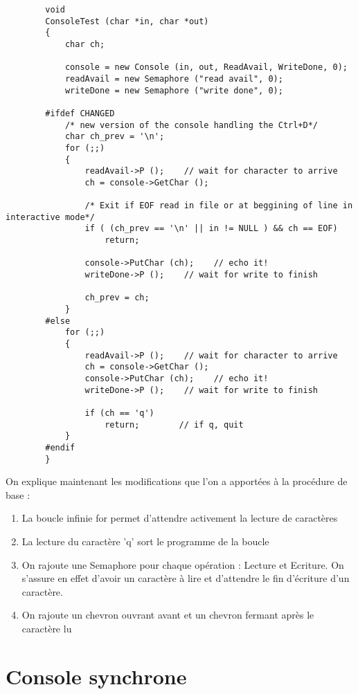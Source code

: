 \documentclass[a4paper,10pt]{article}
\begin{document}
    \begin{lstlisting}
        void
        ConsoleTest (char *in, char *out)
        {
            char ch;

            console = new Console (in, out, ReadAvail, WriteDone, 0);
            readAvail = new Semaphore ("read avail", 0);
            writeDone = new Semaphore ("write done", 0);

        #ifdef CHANGED
            /* new version of the console handling the Ctrl+D*/
            char ch_prev = '\n';
            for (;;)
            {
                readAvail->P ();    // wait for character to arrive
                ch = console->GetChar ();

                /* Exit if EOF read in file or at beggining of line in interactive mode*/
                if ( (ch_prev == '\n' || in != NULL ) && ch == EOF)
                    return;

                console->PutChar (ch);    // echo it!
                writeDone->P ();    // wait for write to finish

                ch_prev = ch;
            }
        #else
            for (;;)
            {
                readAvail->P ();    // wait for character to arrive
                ch = console->GetChar ();
                console->PutChar (ch);    // echo it!
                writeDone->P ();    // wait for write to finish

                if (ch == 'q')
                    return;        // if q, quit
            }
        #endif
        }
    \end{lstlisting}

    On explique maintenant les modifications que l'on a apportées à la procédure de base :
    \begin{enumerate}
        \item La boucle infinie for permet d'attendre activement la lecture de caractères
        \item La lecture du caractère 'q' sort le programme de la boucle
        \item On rajoute une Semaphore pour chaque opération : Lecture et Ecriture. On s'assure en effet d'avoir un caractère à lire et d'attendre le fin d'écriture d'un caractère.
        \item On rajoute un chevron ouvrant avant et un chevron fermant après le caractère lu
    \end{enumerate}

\section{Console synchrone}
\end{document}
